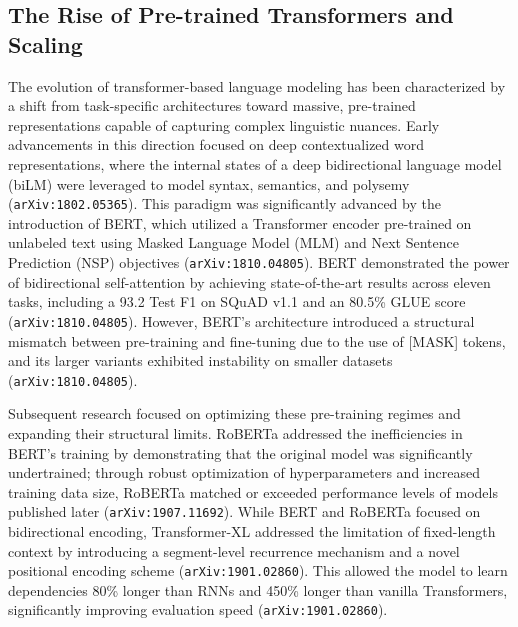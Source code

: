 \documentclass[11pt]{article}
\begin{document}
\subsection{The Rise of Pre-trained Transformers and Scaling}

The evolution of transformer-based language modeling has been characterized by a shift from task-specific architectures toward massive, pre-trained representations capable of capturing complex linguistic nuances. Early advancements in this direction focused on deep contextualized word representations, where the internal states of a deep bidirectional language model (biLM) were leveraged to model syntax, semantics, and polysemy (\texttt{arXiv:1802.05365}). This paradigm was significantly advanced by the introduction of BERT, which utilized a Transformer encoder pre-trained on unlabeled text using Masked Language Model (MLM) and Next Sentence Prediction (NSP) objectives (\texttt{arXiv:1810.04805}). BERT demonstrated the power of bidirectional self-attention by achieving state-of-the-art results across eleven tasks, including a 93.2 Test F1 on SQuAD v1.1 and an 80.5\% GLUE score (\texttt{arXiv:1810.04805}). However, BERT's architecture introduced a structural mismatch between pre-training and fine-tuning due to the use of [MASK] tokens, and its larger variants exhibited instability on smaller datasets (\texttt{arXiv:1810.04805}).

Subsequent research focused on optimizing these pre-training regimes and expanding their structural limits. RoBERTa addressed the inefficiencies in BERT's training by demonstrating that the original model was significantly undertrained; through robust optimization of hyperparameters and increased training data size, RoBERTa matched or exceeded performance levels of models published later (\texttt{arXiv:1907.11692}). While BERT and RoBERTa focused on bidirectional encoding, Transformer-XL addressed the limitation of fixed-length context by introducing a segment-level recurrence mechanism and a novel positional encoding scheme (\texttt{arXiv:1901.02860}). This allowed the model to learn dependencies 80\% longer than RNNs and 450\% longer than vanilla Transformers, significantly improving evaluation speed (\texttt{arXiv:1901.02860}).
\end{document}
